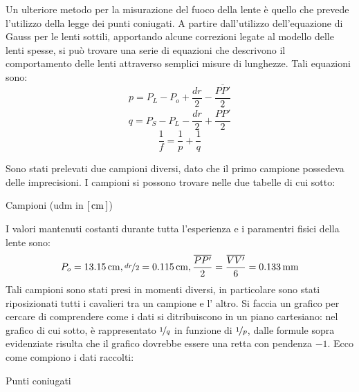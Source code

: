 Un ulteriore metodo per la misurazione del fuoco della lente è quello che prevede l'utilizzo della legge dei punti coniugati.
 A partire dall'utilizzo dell'equazione di Gauss per le lenti sottili, apportando alcune correzioni legate al modello delle lenti
 spesse, si può trovare una serie di equazioni che descrivono il comportamento delle lenti attraverso semplici misure di
 lunghezze. Tali equazioni sono:
\[p=P_L - P_o + \frac {dr} {2} - \frac {\overline{PP'}}{2}\]
\[q=P_S - P_L -\frac {dr} {2} + \frac {\overline{PP'}} {2}\]
\begin{equation} \label{eq:punticoniugati}
\frac{1}{f} = \frac {1}{p} + \frac {1}{q}
\end{equation}

 Sono stati prelevati due campioni diversi, dato che il primo campione possedeva delle imprecisioni. I campioni si possono trovare
 nelle due tabelle di cui sotto:
\begin{tabella}
	\centering
	
	\caption{Campioni (udm in $[\,\mathrm{cm}\,]$)}
	\label{tab:02tab1}
\end{tabella}

I valori mantenuti costanti durante tutta l'esperienza e i paramentri fisici della lente sono:
\[P_o = 13.15 \,\mathrm{cm} , \nicefrac{dr}{2} = 0.115 \,\mathrm{cm} ,\frac {\overline{PP'}}{2} = \frac{\overline{VV'}}{6} = 0.133 \,\mathrm{mm}\]
Tali campioni sono stati presi in momenti diversi, in particolare sono stati riposizionati tutti i cavalieri tra un campione e l'
 altro. Si faccia un grafico per cercare di comprendere come i dati si ditribuiscono in un piano cartesiano: nel grafico di cui
 sotto, è rappresentato $\nicefrac{1}{q}$ in funzione di $\nicefrac{1}{p}$, dalle formule sopra evidenziate risulta che il grafico dovrebbe essere una retta con
 pendenza $-1$. Ecco come compiono i dati raccolti:
\begin{grafico} \centering  \caption{Punti coniugati} \label{gr:02graph1.tex} \end{grafico}

